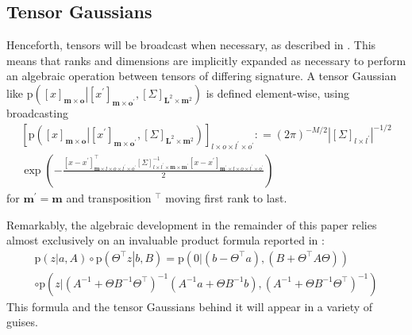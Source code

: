 \documentclass[preprint,12pt]{elsarticle}
\newcommand*{\M}[1]{\ensuremath{#1}\xspace}
\newcommand*{\tr}[1]{\M{#1}}
\newcommand*{\x}{\times}
\newcommand*{\mi}[1]{\mathbf{#1}}
\newcommand*{\te}[2][]{\left\lbrack{#2}\right\rbrack_{#1}}
\newcommand*{\prob}[3]{\M{\mathrm{p}\!\left(\left.{#1}\right\vert{#2,#3}\right)}}
\newcommand*{\deq}{\M{\mathrel{\mathop:}=}}
\newcommand*{\modulus}[1]{\M{\left\lvert{#1}\right\rvert}}
\begin{document}
    \subsection{Tensor Gaussians} \label{sub:GPR:Tensor}
        Henceforth, tensors will be broadcast when necessary, as described in \cite{Numpy2022,Harris2020}. This means that ranks and dimensions are implicitly expanded as necessary to perform an algebraic operation between tensors of differing signature. A tensor Gaussian like $\prob{\te[\mi{m}\x\mi{o}]{x}}{\te[\mi{m}\x\mi{o^{\prime}}]{x^{\prime}}}
        {\te[\mi{L}^{2}\x\mi{m}^{2}]{\Sigma}}$ is defined element-wise, using broadcasting
        \begin{multline} \label{def:Notation:p}
            \te[l\x o \x l^{\prime}\x o^{\prime}]{\prob{\te[\mi{m}\x\mi{o}]{x}}{\te[\mi{m}\x\mi{o^{\prime}}]{x^{\prime}}}
            {\te[\mi{L}^{2}\x\mi{m}^{2}]{\Sigma}}}
            \deq (2 \pi)^{-M/2} \modulus{\te[l\x l^{\prime}]{\Sigma}}^{-1/2} \\
            \exp\left(-\frac{
                \te[\mi{m}\x l\x o\x l^{\prime}\x o^{\prime}]{x-x^{\prime}}^{\intercal} 
            \te[l\x l^{\prime}\x\mi{m\x m^{\prime}}]{\Sigma}^{-1} 
            \te[\mi{m^{\prime}}\x l\x o\x l^{\prime}\x o^{\prime}]{x-x^{\prime}}}
            {2}\right)
        \end{multline}
        for $\mi{m^{\prime}} = \mi{m}$ and transposition $^{\intercal}$ moving first rank to last.

        Remarkably, the algebraic development in the remainder of this paper relies almost exclusively on an invaluable product formula reported in \cite{Rasmussen2016}:
        \begin{multline} \label{eq:GPR:product}
            \prob{z}{a}{A} \circ \prob{\Theta^{\intercal}z}{\tr{b}}{\tr{B}}
            = \prob{0}{(b-\Theta^{\intercal}a)}{(B + \Theta^{\intercal}A\Theta)} \\
            \circ \prob{z}
            {(A^{-1}+\Theta B^{-1}\Theta^{\intercal})^{-1}(A^{-1}a+\Theta B^{-1}b)}
            {(A^{-1}+\Theta B^{-1}\Theta^{\intercal})^{-1}}
        \end{multline}
        This formula and the tensor Gaussians behind it will appear in a variety of guises.
\end{document}
